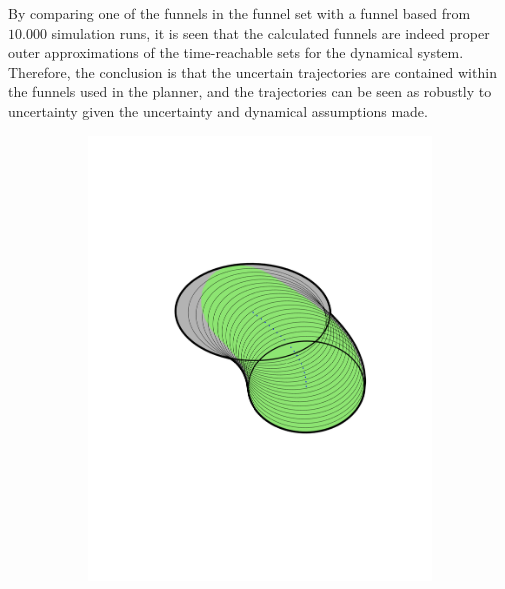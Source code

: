 By comparing one of the funnels in the funnel set with a funnel based from
\(10.000\) simulation runs, it is seen that the calculated funnels are indeed
proper outer approximations of the time-reachable sets for the dynamical system.
Therefore, the conclusion is that the uncertain trajectories are contained
within the funnels used in the planner, and the trajectories can be seen as
robustly to uncertainty given the uncertainty and dynamical assumptions made.

\begin{figure}
  \begin{subfigure}[b]{0.3\textwidth}
    \includegraphics[width=\textwidth]{figures/method/FunnelSimnew4}
  \end{subfigure}
  \begin{subfigure}[b]{0.3\textwidth}

\end{subfigure}
\end{figure}
